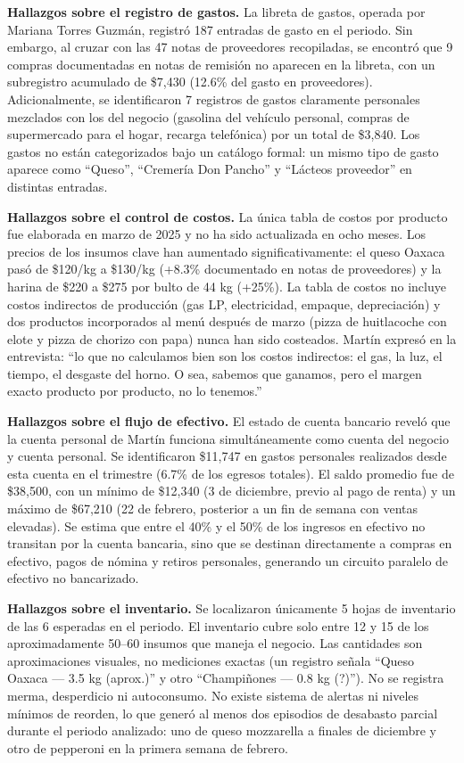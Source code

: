 \documentclass[12pt,letterpaper]{article}
\begin{document}
\textbf{Hallazgos sobre el registro de gastos.} La libreta de gastos, operada por Mariana Torres Guzmán, registró 187 entradas de gasto en el periodo. Sin embargo, al cruzar con las 47 notas de proveedores recopiladas, se encontró que 9 compras documentadas en notas de remisión no aparecen en la libreta, con un subregistro acumulado de \$7,430 (12.6\% del gasto en proveedores). Adicionalmente, se identificaron 7 registros de gastos claramente personales mezclados con los del negocio (gasolina del vehículo personal, compras de supermercado para el hogar, recarga telefónica) por un total de \$3,840. Los gastos no están categorizados bajo un catálogo formal: un mismo tipo de gasto aparece como ``Queso'', ``Cremería Don Pancho'' y ``Lácteos proveedor'' en distintas entradas.

\textbf{Hallazgos sobre el control de costos.} La única tabla de costos por producto fue elaborada en marzo de 2025 y no ha sido actualizada en ocho meses. Los precios de los insumos clave han aumentado significativamente: el queso Oaxaca pasó de \$120/kg a \$130/kg (+8.3\% documentado en notas de proveedores) y la harina de \$220 a \$275 por bulto de 44 kg (+25\%). La tabla de costos no incluye costos indirectos de producción (gas LP, electricidad, empaque, depreciación) y dos productos incorporados al menú después de marzo (pizza de huitlacoche con elote y pizza de chorizo con papa) nunca han sido costeados. Martín expresó en la entrevista: ``lo que no calculamos bien son los costos indirectos: el gas, la luz, el tiempo, el desgaste del horno. O sea, sabemos que ganamos, pero el margen exacto producto por producto, no lo tenemos.''

\textbf{Hallazgos sobre el flujo de efectivo.} El estado de cuenta bancario reveló que la cuenta personal de Martín funciona simultáneamente como cuenta del negocio y cuenta personal. Se identificaron \$11,747 en gastos personales realizados desde esta cuenta en el trimestre (6.7\% de los egresos totales). El saldo promedio fue de \$38,500, con un mínimo de \$12,340 (3 de diciembre, previo al pago de renta) y un máximo de \$67,210 (22 de febrero, posterior a un fin de semana con ventas elevadas). Se estima que entre el 40\% y el 50\% de los ingresos en efectivo no transitan por la cuenta bancaria, sino que se destinan directamente a compras en efectivo, pagos de nómina y retiros personales, generando un circuito paralelo de efectivo no bancarizado.

\textbf{Hallazgos sobre el inventario.} Se localizaron únicamente 5 hojas de inventario de las 6 esperadas en el periodo. El inventario cubre solo entre 12 y 15 de los aproximadamente 50--60 insumos que maneja el negocio. Las cantidades son aproximaciones visuales, no mediciones exactas (un registro señala ``Queso Oaxaca --- 3.5 kg (aprox.)'' y otro ``Champiñones --- 0.8 kg (?)'').  No se registra merma, desperdicio ni autoconsumo. No existe sistema de alertas ni niveles mínimos de reorden, lo que generó al menos dos episodios de desabasto parcial durante el periodo analizado: uno de queso mozzarella a finales de diciembre y otro de pepperoni en la primera semana de febrero.
\end{document}
